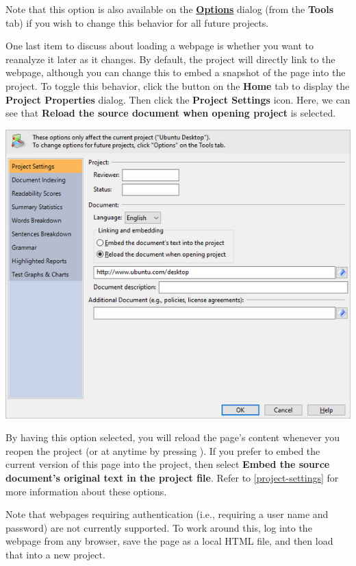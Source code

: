 \documentclass[
]{book}
\theoremstyle{definition}
\theoremstyle{definition}
\theoremstyle{definition}
\theoremstyle{definition}
\theoremstyle{remark}
\begin{document}
Note that this option is also available on the \protect\hyperlink{options-overview}{\textbf{Options}} dialog (from the \textbf{Tools} tab) if you wish to change this behavior for all future projects.

One last item to discuss about loading a webpage is whether you want to reanalyze it later as it changes. By default, the project will directly link to the webpage, although you can change this to embed a snapshot of the page into the project. To toggle this behavior, click the  button on the \textbf{Home} tab to display the \textbf{Project Properties} dialog. Then click the \textbf{Project Settings} icon. Here, we can see that \textbf{Reload the source document when opening project} is selected.

\includegraphics{Images/reloadwebpage.png}

By having this option selected, you will reload the page's content whenever you reopen the project (or at anytime by pressing ). If you prefer to embed the current version of this page into the project, then select \textbf{Embed the source document's original text in the project file}. Refer to \ref{project-settings} for more information about these options.

Note that webpages requiring authentication (i.e., requiring a user name and password) are not currently supported. To work around this, log into the webpage from any browser, save the page as a local HTML file, and then load that into a new project.
\end{document}
